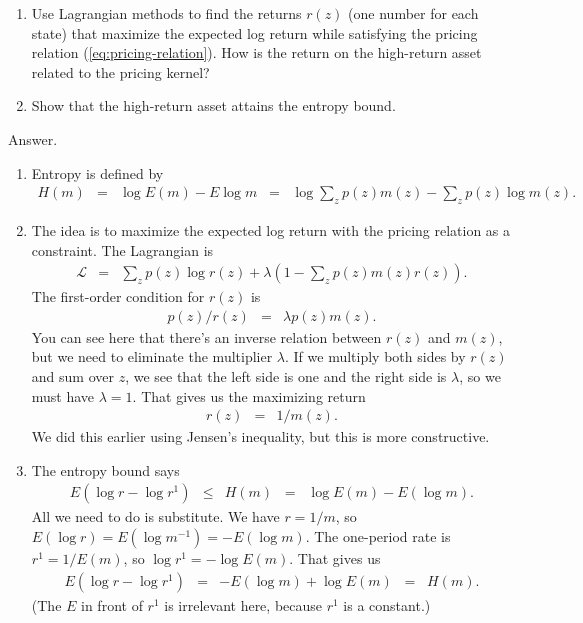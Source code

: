 \documentclass[11pt]{article}
\begin{document}
\begin{enumerate}
\begin{enumerate}
\item Use Lagrangian methods to find the returns $r(z)$ (one number for each state)
that maximize the expected log return while satisfying the pricing relation (\ref{eq:pricing-relation}).
How is the return on the high-return asset related to the pricing kernel?

\item Show that the high-return asset attains the entropy bound.
\end{enumerate}
%
Answer.
\begin{enumerate}
\item Entropy is defined by
\begin{eqnarray*}
    H(m) &=& \log E(m) - E \log m
            \;\;=\;\; \log \sum_z p(z) m(z) - \sum_z p(z) \log m(z) .
\end{eqnarray*}

\item The idea is to maximize the expected log return with the pricing
relation as a constraint.
The Lagrangian is
\begin{eqnarray*}
    \mathcal{L} &=&     \sum_z p(z) \log r(z)
            + \lambda \left( 1 - \sum_z p(z) m(z) r(z) \right) .
\end{eqnarray*}
The first-order condition for $r(z)$ is
\begin{eqnarray*}
     p(z) / r(z) &=&  \lambda  p(z) m(z) .
\end{eqnarray*}
You can see here that there's an inverse relation between $r(z)$ and $m(z)$,
but we need to eliminate the multiplier $\lambda$.
If we multiply both sides by $r(z)$ and sum over $z$,
we see that the left side is one and the right side is $\lambda$,
so we must have $\lambda = 1$.
That gives us the maximizing return
\begin{eqnarray*}
      r(z) &=&  1/ m(z) .
\end{eqnarray*}
We did this earlier using Jensen's inequality,
but this is more constructive.

\item The entropy bound says
\begin{eqnarray*}
    E (\log r - \log r^1) &\leq& H(m) \;\;=\;\; \log E(m) - E (\log m) .
\end{eqnarray*}
All we need to do is substitute.
We have $r = 1/m$, so
$ E (\log r) = E (\log m^{-1}) = - E (\log m)$.
The one-period rate is $ r^1 = 1/ E(m)$, so
$ \log r^1 = - \log E(m)$.
That gives us
\begin{eqnarray*}
    E (\log r - \log r^1) &=& - E (\log m) + \log E(m) \;\;=\;\; H(m) .
\end{eqnarray*}
(The $E$ in front of $r^1$ is irrelevant here, because $r^1$ is a constant.)
\end{enumerate}


\end{enumerate}
\end{document}
